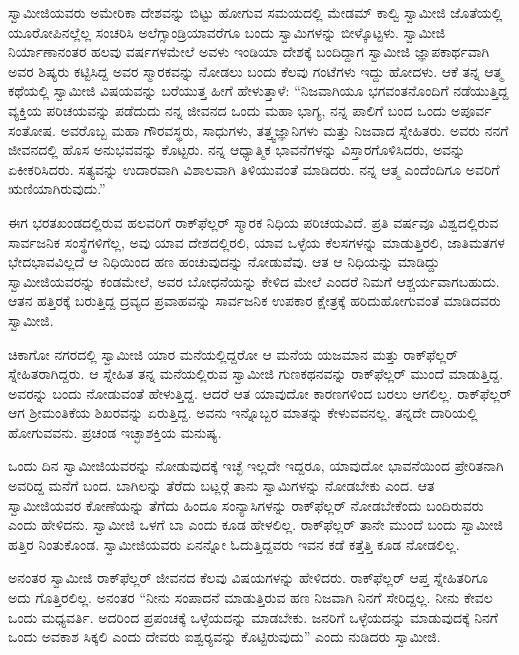  ಸ್ವಾಮೀಜಿಯವರು ಅಮೇರಿಕಾ ದೇಶವನ್ನು ಬಿಟ್ಟು ಹೋಗುವ ಸಮಯದಲ್ಲಿ ಮೇಡಮ್ ಕಾಲ್ವಿ ಸ್ವಾಮೀಜಿ ಜೊತೆಯಲ್ಲಿ ಯೂರೋಪಿನಲ್ಲೆಲ್ಲ ಸಂಚರಿಸಿ ಅಲೆಗ್ಸಾಂಡ್ರಿಯಾವರೆಗೂ ಬಂದು ಸ್ವಾಮಿಗಳನ್ನು ಬೀಳ್ಕೊಟ್ಟಳು. ಸ್ವಾಮೀಜಿ ನಿರ್ಯಾಣಾನಂತರ ಹಲವು ವರ್ಷಗಳಮೇಲೆ ಅವಳು ಇಂಡಿಯಾ ದೇಶಕ್ಕೆ ಬಂದಿದ್ದಾಗ ಸ್ವಾಮೀಜಿ ಜ್ಞಾಪಕಾರ್ಥವಾಗಿ ಅವರ ಶಿಷ್ಯರು ಕಟ್ಟಿಸಿದ್ದ ಅವರ ಸ್ಮಾರಕವನ್ನು ನೋಡಲು ಬಂದು ಕೆಲವು ಗಂಟೆಗಳು ಇದ್ದು ಹೋದಳು. ಆಕೆ ತನ್ನ ಆತ್ಮ ಕಥೆಯಲ್ಲಿ ಸ್ವಾಮೀಜಿ ವಿಷಯವನ್ನು ಬರೆಯುತ್ತ ಹೀಗೆ ಹೇಳುತ್ತಾಳೆ: “ನಿಜವಾಗಿಯೂ ಭಗವಂತನೊಂದಿಗೆ ನಡೆಯುತ್ತಿದ್ದ ವ್ಯಕ್ತಿಯ ಪರಿಚಯವನ್ನು ಪಡೆದುದು ನನ್ನ ಜೀವನದ ಒಂದು ಮಹಾ ಭಾಗ್ಯ, ನನ್ನ ಪಾಲಿಗೆ ಬಂದ ಒಂದು ಅಪೂರ್ವ ಸಂತೋಷ. ಅವರೊಬ್ಬ ಮಹಾ ಗೌರವಸ್ಥರು, ಸಾಧುಗಳು, ತತ್ತ್ವಜ್ಞಾನಿಗಳು ಮತ್ತು ನಿಜವಾದ ಸ್ನೇಹಿತರು. ಅವರು ನನಗೆ ಜೀವನದಲ್ಲಿ ಹೊಸ ಅನುಭವವನ್ನು ಕೊಟ್ಟರು. ನನ್ನ ಆಧ್ಯಾತ್ಮಿಕ ಭಾವನೆಗಳನ್ನು ವಿಸ್ತಾರಗೊಳಿಸಿದರು, ಅವನ್ನು ಏಕೀಕರಿಸಿದರು. ಸತ್ಯವನ್ನು ಉದಾರವಾಗಿ ವಿಶಾಲವಾಗಿ ತಿಳಿಯುವಂತೆ ಮಾಡಿದರು. ನನ್ನ ಆತ್ಮ ಎಂದೆಂದಿಗೂ ಅವರಿಗೆ ಋಣಿಯಾಗಿರುವುದು.” 

 ಈಗ ಭರತಖಂಡದಲ್ಲಿರುವ ಹಲವರಿಗೆ ರಾಕ್‍ಫೆಲ್ಲರ್ ಸ್ಮಾರಕ ನಿಧಿಯ ಪರಿಚಯವಿದೆ. ಪ್ರತಿ ವರ್ಷವೂ ವಿಶ್ವದಲ್ಲಿರುವ ಸಾರ್ವಜನಿಕ ಸಂಸ್ಥೆಗಳಿಗೆಲ್ಲ, ಅವು ಯಾವ ದೇಶದಲ್ಲಿರಲಿ, ಯಾವ ಒಳ್ಳೆಯ ಕೆಲಸಗಳನ್ನು ಮಾಡುತ್ತಿರಲಿ, ಜಾತಿಮತಗಳ ಭೇದಭಾವವಿಲ್ಲದೆ ಆ ನಿಧಿಯಿಂದ ಹಣ ಹಂಚುವುದನ್ನು ನೋಡುವೆವು. ಆತ ಆ ನಿಧಿಯನ್ನು ಮಾಡಿದ್ದು ಸ್ವಾಮೀಜಿಯವರನ್ನು ಕಂಡಮೇಲೆ, ಅವರ ಬೋಧನೆಯನ್ನು ಕೇಳಿದ ಮೇಲೆ ಎಂದರೆ ನಿಮಗೆ ಆಶ್ಚರ್ಯವಾಗಬಹುದು. ಆತನ ಹತ್ತಿರಕ್ಕೆ ಬರುತ್ತಿದ್ದ ದ್ರವ್ಯದ ಪ್ರವಾಹವನ್ನು ಸಾರ್ವಜನಿಕ ಉಪಕಾರ ಕ್ಷೇತ್ರಕ್ಕೆ ಹರಿದುಹೋಗುವಂತೆ ಮಾಡಿದವರು ಸ್ವಾಮೀಜಿ. 

 ಚಿಕಾಗೋ ನಗರದಲ್ಲಿ ಸ್ವಾಮೀಜಿ ಯಾರ ಮನೆಯಲ್ಲಿದ್ದರೋ ಆ ಮನೆಯ ಯಜಮಾನ ಮತ್ತು ರಾಕ್‍ಫೆಲ್ಲರ್ ಸ್ನೇಹಿತರಾಗಿದ್ದರು. ಆ ಸ್ನೇಹಿತ ತನ್ನ ಮನೆಯಲ್ಲಿರುವ ಸ್ವಾಮೀಜಿ ಗುಣಕಥನವನ್ನು ರಾಕ್‍ಫೆಲ್ಲರ್ ಮುಂದೆ ಮಾಡುತ್ತಿದ್ದ. ಅವರನ್ನು ಬಂದು ನೋಡುವಂತೆ ಹೇಳುತ್ತಿದ್ದ. ಆದರೆ ಆತ ಯಾವುದೋ ಕಾರಣಗಳಿಂದ ಬರಲು ಆಗಲಿಲ್ಲ. ರಾಕ್‍ಫೆಲ್ಲರ್ ಆಗ ಶ‍್ರೀಮಂತಿಕೆಯ ಶಿಖರವನ್ನು ಏರುತ್ತಿದ್ದ. ಅವನು ಇನ್ನೊಬ್ಬರ ಮಾತನ್ನು ಕೇಳುವವನಲ್ಲ. ತನ್ನದೇ ದಾರಿಯಲ್ಲಿ ಹೋಗುವವನು. ಪ್ರಚಂಡ ಇಚ್ಛಾಶಕ್ತಿಯ ಮನುಷ್ಯ. 

 ಒಂದು ದಿನ ಸ್ವಾಮೀಜಿಯವರನ್ನು ನೋಡುವುದಕ್ಕೆ ಇಚ್ಛೆ ಇಲ್ಲದೇ ಇದ್ದರೂ, ಯಾವುದೋ ಭಾವನೆಯಿಂದ ಪ್ರೇರಿತನಾಗಿ ಅವರಿದ್ದ ಮನೆಗೆ ಬಂದ. ಬಾಗಿಲನ್ನು ತೆರೆದು ಬಟ್ಲರ್‍ಗೆ ತಾನು ಸ್ವಾಮಿಗಳನ್ನು ನೋಡಬೇಕು ಎಂದ. ಆತ ಸ್ವಾಮೀಜಿಯವರ ಕೋಣೆಯನ್ನು ತೆಗೆದು ಹಿಂದೂ ಸಂನ್ಯಾಸಿಗಳನ್ನು ರಾಕ್‍ಫೆಲ್ಲರ್ ನೋಡಬೇಕೆಂದು ಬಂದಿರುವರು ಎಂದು ಹೇಳಿದನು. ಸ್ವಾಮೀಜಿ ಒಳಗೆ ಬಾ ಎಂದು ಕೂಡ ಹೇಳಲಿಲ್ಲ. ರಾಕ್‍ಫೆಲ್ಲರ್ ತಾನೇ ಮುಂದೆ ಬಂದು ಸ್ವಾಮೀಜಿ ಹತ್ತಿರ ನಿಂತುಕೊಂಡ. ಸ್ವಾಮೀಜಿಯವರು ಏನನ್ನೋ ಓದುತ್ತಿದ್ದವರು ಇವನ ಕಡೆ ಕತ್ತೆತ್ತಿ ಕೂಡ ನೋಡಲಿಲ್ಲ. 

 ಅನಂತರ ಸ್ವಾಮೀಜಿ ರಾಕ್‍ಫೆಲ್ಲರ್ ಜೀವನದ ಕೆಲವು ವಿಷಯಗಳನ್ನು ಹೇಳಿದರು. ರಾಕ್‍ಫೆಲ್ಲರ್ ಆಪ್ತ ಸ್ನೇಹಿತರಿಗೂ ಅದು ಗೊತ್ತಿರಲಿಲ್ಲ. ಅನಂತರ “ನೀನು ಸಂಪಾದನೆ ಮಾಡುತ್ತಿರುವ ಹಣ ನಿಜವಾಗಿ ನಿನಗೆ ಸೇರಿದ್ದಲ್ಲ. ನೀನು ಕೇವಲ ಒಂದು ಮಧ್ಯವರ್ತಿ. ಅದರಿಂದ ಪ್ರಪಂಚಕ್ಕೆ ಒಳ್ಳೆಯದನ್ನು ಮಾಡಬೇಕು. ಜನರಿಗೆ ಒಳ್ಳೆಯದನ್ನು ಮಾಡುವುದಕ್ಕೆ ನಿನಗೆ ಒಂದು ಅವಕಾಶ ಸಿಕ್ಕಲಿ ಎಂದು ದೇವರು ಐಶ್ವರ‍್ಯವನ್ನು ಕೊಟ್ಟಿರುವುದು” ಎಂದು ನುಡಿದರು ಸ್ವಾಮೀಜಿ. 

